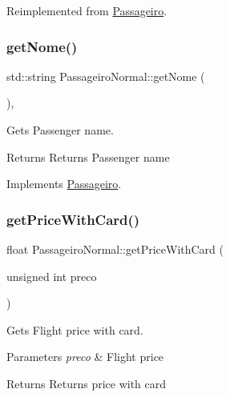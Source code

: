 Reimplemented from \hyperlink{class_passageiro_aa38cf36a9d750417fc0b83781886a852}{Passageiro}.

\mbox{\label{class_passageiro_normal_a09b0c8bc050ba663965559e94f5c5d1d}} 
\subsubsection{\texorpdfstring{get\+Nome()}{getNome()}}
{\footnotesize\ttfamily std\+::string Passageiro\+Normal\+::get\+Nome (\begin{DoxyParamCaption}{ }\end{DoxyParamCaption})\hspace{0.3cm}{\ttfamily [inline]}, {\ttfamily [virtual]}}



Gets Passenger name. 

\begin{DoxyReturn}{Returns}
Returns Passenger name 
\end{DoxyReturn}


Implements \hyperlink{class_passageiro_a1871c2ce0cc1254ffc665a415ec7a815}{Passageiro}.

\mbox{\label{class_passageiro_normal_a8932fec94ce61c2488b51c90955f3d34}} 
\subsubsection{\texorpdfstring{get\+Price\+With\+Card()}{getPriceWithCard()}}
{\footnotesize\ttfamily float Passageiro\+Normal\+::get\+Price\+With\+Card (\begin{DoxyParamCaption}\item[{unsigned int}]{preco }\end{DoxyParamCaption})\hspace{0.3cm}{\ttfamily [virtual]}}



Gets Flight price with card. 


\begin{DoxyParams}{Parameters}
{\em preco} & Flight price\\
\hline
\end{DoxyParams}
\begin{DoxyReturn}{Returns}
Returns price with card 
\end{DoxyReturn}


